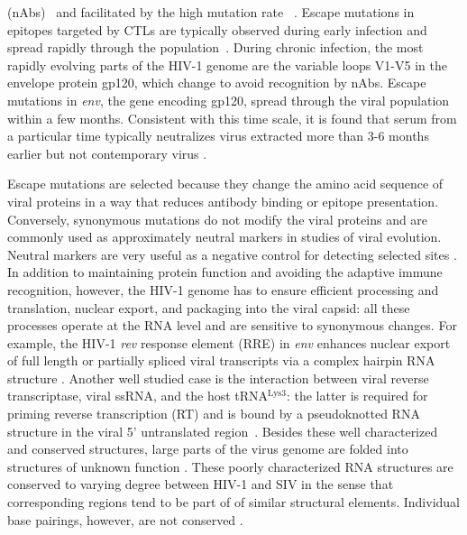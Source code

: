\documentclass[rmp, twocolumn]{revtex4}
\newcommand{\rev}{\textit{rev}}
\newcommand{\env}{\textit{env}}
\begin{document}
(nAbs)~\citep{rambaut_causes_2004} and facilitated by the high mutation rate
~\citep{mansky_lower_1995,abram_nature_2010}.  Escape mutations
in epitopes targeted by CTLs are typically observed during early infection and spread
rapidly through the population~\citep{mcmichael_immune_2009}. During chronic
infection, the most rapidly evolving parts of the HIV-1 genome are the variable
loops V1-V5 in the envelope protein gp120, which change to avoid recognition by
nAbs. Escape mutations in \env, the gene encoding gp120, spread through the
viral population within a few months.
Consistent with this time scale, it is found that serum from a particular time
typically neutralizes virus extracted more than 3-6 months earlier but not contemporary
virus \citep{richman_rapid_2003}.

Escape mutations are selected because they change the amino acid sequence of
viral proteins in a way that reduces antibody binding or epitope presentation.
Conversely, synonymous mutations do not modify the viral proteins and are
commonly used as approximately neutral markers in studies of viral evolution.
Neutral markers are very useful as a negative control for detecting selected
sites \citep{Bhatt:2011p43255,Hurst:2002p32608,Chen:2004p22606}. In addition to
maintaining protein function and avoiding the adaptive immune recognition,
however, the HIV-1 genome has to ensure efficient processing and translation,
nuclear export, and packaging into the viral capsid: all these processes operate
at the RNA level and are sensitive to synonymous changes. For example, the HIV-1
\rev{} response element (RRE) in \env{} enhances nuclear export of full length
or partially spliced viral transcripts via a complex hairpin RNA structure
\citep{fernandes_hiv-1_2012}. Another well studied case is the interaction
between viral reverse transcriptase, viral ssRNA, and the host
tRNA$^\text{Lys3}$: the latter is required for priming reverse transcription
(RT) and is bound by a pseudoknotted RNA structure in the viral 5' untranslated
region~\citep{barat_interaction_1991, paillart_vitro_2002}. 
Besides these well characterized and conserved structures, large parts of the virus
genome are folded into structures of unknown function
\citep{watts_architecture_2009}. These poorly characterized RNA
structures are conserved to varying degree between HIV-1 and
SIV in the sense that corresponding regions tend to be part of
of similar structural elements. Individual base pairings, however, are
not conserved \citep{pollom_comparison_2013}. 
\end{document}
